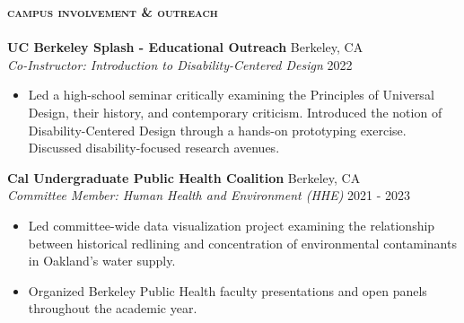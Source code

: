 \documentclass[a4paper]{article}
\newcommand{\lineunder} {
    \vspace*{-8pt} \\
    \hspace*{-18pt} \hrulefill \\
}
\newcommand{\header} [1] {
    {\hspace*{-18pt}\vspace*{6pt} \large{\textbf{\textsc{\MakeLowercase{#1}}}}}
    \vspace*{-6pt}\lineunder
}
\begin{document}
\vspace{4mm}
\header{Campus Involvement \& Outreach}
\vspace{2mm}
\textbf{UC Berkeley Splash - Educational Outreach} \hfill Berkeley, CA \\
\textit{Co-Instructor: Introduction to Disability-Centered Design} \hfill 2022\\
\vspace{-1mm}
\begin{itemize} \itemsep 1pt
\setlength\itemsep{0pt}  %
	\setlength\parskip{0pt}  %
	\setlength\parsep{0pt}  %
	\setlength\leftskip{0pt}  %
	\renewcommand\labelitemi{\tiny$\bullet$} %
	\item Led a high-school seminar critically examining the Principles of Universal Design, their history, and contemporary criticism. Introduced the notion of Disability-Centered Design through a hands-on prototyping exercise. Discussed disability-focused research avenues. 
\end{itemize}

\textbf{Cal Undergraduate Public Health Coalition} \hfill Berkeley, CA\\
\textit{Committee Member: Human Health and Environment (HHE)} \hfill 2021 - 2023\\
\vspace{-1mm}
\begin{itemize} \itemsep1pt
\setlength\itemsep{0pt}  %
	\setlength\parskip{0pt}  %
	\setlength\parsep{0pt}  %
	\setlength\leftskip{0pt}  %
	\renewcommand\labelitemi{\tiny$\bullet$} %
	\item Led committee-wide data visualization project examining the relationship between historical redlining and concentration of environmental contaminants in Oakland's water supply. 
        \item Organized Berkeley Public Health faculty presentations and open panels throughout the academic year.
\end{itemize}
\end{document}
